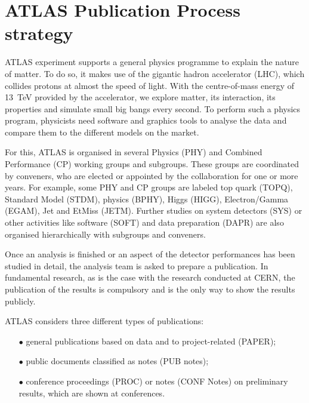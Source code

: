 
\section{ATLAS Publication Process strategy}%
\label{sec:ATLAS_work_strategy}


ATLAS experiment supports a  general physics programme to explain the nature of matter. To do so,  it makes use of the gigantic hadron accelerator (LHC), which collides protons at almost the speed of light. With the centre-of-mass energy of \SI{13}{\TeV} provided by the accelerator, we explore matter, its interaction, its properties and simulate small big bangs every second. To perform such a physics program, physicists need software and graphics tools to analyse the data and compare them to the different models on the market.

For this, ATLAS is organised in several Physics (PHY) and  Combined Performance (CP) working groups and subgroups. These groups are coordinated by conveners, who are elected or appointed by the collaboration for one or more years.
For example, some  PHY and CP groups are labeled top quark (TOPQ), Standard Model (STDM), \PB physics (BPHY), Higgs (HIGG), Electron/Gamma (EGAM), Jet and EtMiss (JETM).
Further studies on system detectors (SYS) or other activities like software (SOFT) and data preparation (DAPR) are also organised hierarchically with subgroups and conveners.

Once an analysis is finished or an aspect of the detector performances has been studied in detail,
the analysis team is asked to prepare a publication.
In fundamental research, as is the case with the research conducted at CERN, the publication of the results is  compulsory and is the only way to show the results publicly.

ATLAS considers three different types of publications:
\begin{itemize}
    \item[$\bullet$] general publications based on data and to project-related  (PAPER);
    \item[$\bullet$] public documents classified as notes (PUB notes);
    \item[$\bullet$] conference proceedings (PROC) or notes (CONF Notes) on preliminary results, which are shown at conferences.
\end{itemize}

